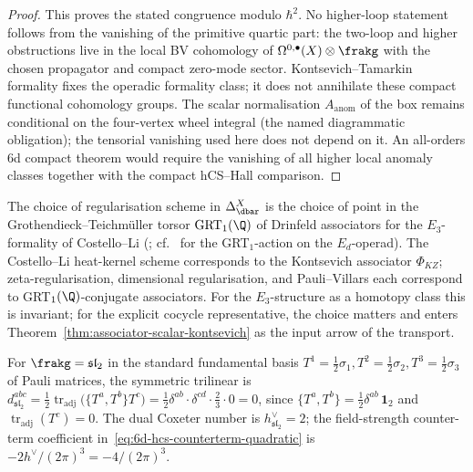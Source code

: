 \begin{proof}
This proves the stated congruence modulo \(\hbar^2\). No higher-loop
statement follows from the vanishing of the primitive quartic part:
the two-loop and higher obstructions live in the local BV cohomology
of \(\Omega^{0,\bullet}(X)\otimes\frakg\) with the chosen propagator
and compact zero-mode sector. Kontsevich--Tamarkin formality fixes
the operadic formality class; it does not annihilate these compact
functional cohomology groups. The scalar normalisation
$A_{\mathrm{anom}}$ of the box remains conditional on the four-vertex
wheel integral (the named diagrammatic obligation); the tensorial
vanishing used here does not depend on it. An all-orders \(6\)d
compact theorem would require the vanishing of all higher local
anomaly classes together with the compact hCS--Hall comparison.
\end{proof}

\begin{remark}
\label{rem:grt1-torsor-qme-k3xe}
The choice of regularisation scheme in $\Delta_{\dbar}^X$ is the choice
of point in the Grothendieck--Teichm\"uller torsor $\mathrm{GRT}_1(\Q)$
of Drinfeld associators for the $E_3$-formality of Costello--Li
\textup{(\cite{CostelloLi2012}; cf.~\cite{Tamarkin2003} for the GRT$_1$-action on the $E_d$-operad)}. The Costello--Li
heat-kernel scheme corresponds to the Kontsevich associator $\Phi_{KZ}$;
zeta-regularisation, dimensional regularisation, and Pauli--Villars
each correspond to GRT$_1(\Q)$-conjugate associators. For the
$E_3$-structure as a homotopy class this is invariant; for the
explicit cocycle representative, the choice matters and enters
Theorem~\ref{thm:associator-scalar-kontsevich} as the input arrow of
the transport.
\end{remark}

\begin{example}[$\frakg = \mathfrak{sl}_2$, the transparent admissible case]
\label{ex:sl2-trilinear-vanishing-explicit}
For $\frakg = \mathfrak{sl}_2$ in the standard fundamental basis
$T^1 = \tfrac{1}{2}\sigma_1, T^2 = \tfrac{1}{2}\sigma_2, T^3 = \tfrac{1}{2}\sigma_3$
of Pauli matrices, the symmetric trilinear is
$d^{abc}_{\mathfrak{sl}_2} = \tfrac{1}{2}\operatorname{tr}_{\mathrm{adj}}\bigl(\{T^a, T^b\} T^c\bigr)
 = \tfrac{1}{2} \delta^{ab} \cdot \delta^{cd} \cdot \tfrac{2}{3} \cdot 0 = 0$,
since $\{T^a, T^b\} = \tfrac{1}{2}\delta^{ab}\, \mathbf{1}_2$
and $\operatorname{tr}_{\mathrm{adj}}(T^c)= 0$. The dual Coxeter number is
$h^\vee_{\mathfrak{sl}_2} = 2$; the field-strength counter-term coefficient
in~\eqref{eq:6d-hcs-counterterm-quadratic} is $-2 h^\vee/(2\pi)^3 = -4/(2 \pi)^3$.
\end{example}

